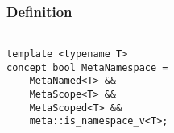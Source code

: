 
\subsubsection{Definition}

\begin{verbatim}

template <typename T>
concept bool MetaNamespace =
	MetaNamed<T> &&
	MetaScope<T> &&
	MetaScoped<T> &&
	meta::is_namespace_v<T>;

\end{verbatim}
